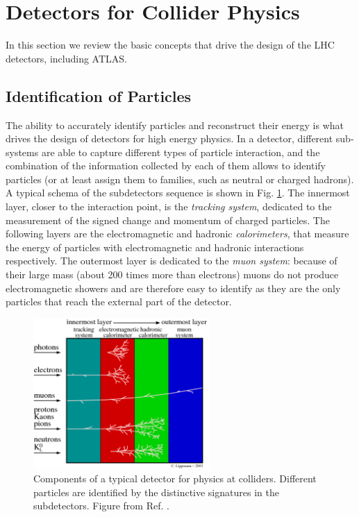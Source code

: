 \section{Detectors for Collider Physics}
\label{sec:detectors}

In this section we review the basic concepts that drive the design of the LHC detectors, including ATLAS.

\subsection{Identification of Particles}
\label{sec:detectors:identification}



The ability to accurately identify particles and reconstruct their energy is what drives the design of detectors for high energy physics. In a detector, different sub-systems are able to capture different types of particle interaction, and the combination of the information collected by each of them allows to identify particles (or at least assign them to families, such as neutral or charged hadrons). A typical schema of the subdetectors sequence is shown in Fig. \ref{fig:detector:interaction}. The innermost layer, closer to the interaction point, is the \textit{tracking system}, dedicated to the measurement of the signed change and momentum of charged particles. The following layers are the electromagnetic and hadronic \textit{calorimeters}, that measure the energy of particles with electromagnetic and hadronic interactions respectively. The outermost layer is dedicated to the \textit{muon system}: because of their large mass (about 200 times more than electrons) muons do not produce electromagnetic showers and are therefore easy to identify as they are the only particles that reach the external part of the detector.

\begin{figure}[ht]
\centering
\includegraphics[width=0.6\textwidth]{figures/detector/particles_in_detector}
\caption{Components of a typical detector for physics at colliders. Different particles are identified by the distinctive signatures in the subdetectors. Figure from Ref. \cite{Lippmann:2011bb}.}
\label{fig:detector:interaction}
\end{figure}


